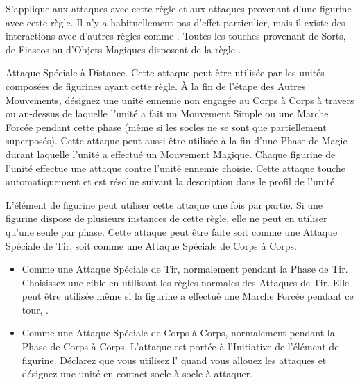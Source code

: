 S'applique aux attaques avec cette règle et aux attaques provenant d'une figurine avec cette règle. Il n'y a habituellement pas d'effet particulier, mais il existe des interactions avec d'autres règles comme \ethereal{}.  Toutes les touches provenant de Sorts, de Fiascos ou d'Objets Magiques disposent de la règle \magicalattacks{}.


Attaque Spéciale à Distance. Cette attaque peut être utilisée par les unités composées de figurines ayant cette règle. À la fin de l'étape des Autres Mouvements, désignez une unité ennemie non engagée au Corps à Corps à travers ou au-dessus de laquelle l'unité a fait un Mouvement Simple ou une Marche Forcée pendant cette phase (même si les socles ne se sont que partiellement superposés). Cette attaque peut aussi être utilisée à la fin d'une Phase de Magie durant laquelle l'unité a effectué un Mouvement Magique. Chaque figurine de l'unité effectue une attaque contre l'unité ennemie choisie. Cette attaque touche automatiquement et est résolue suivant la description dans le profil de l'unité.


L'élément de figurine peut utiliser cette attaque une fois par partie. Si une figurine dispose de plusieurs instances de cette règle, elle ne peut en utiliser qu'une seule par phase. Cette attaque peut être faite soit comme une Attaque Spéciale de Tir, soit comme une Attaque Spéciale de Corps à Corps.
\begin{itemize}[label={\textbullet}]
\item Comme une Attaque Spéciale de Tir, normalement pendant la Phase de Tir. Choisissez une cible en utilisant les règles normales des Attaques de Tir.  Elle peut être utilisée même si la figurine a effectué une Marche Forcée pendant ce tour, .
\item Comme une Attaque Spéciale de Corps à Corps, normalement pendant la Phase de Corps à Corps. L'attaque est portée à l'Initiative de l'élément de figurine. Déclarez que vous utilisez l'\breathweapon{} quand vous allouez les attaques et désignez une unité en contact socle à socle à attaquer.
\end{itemize}

